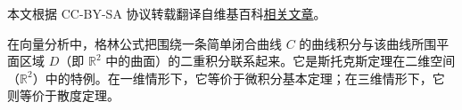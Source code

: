 
本文根据 CC-BY-SA 协议转载翻译自维基百科\href{https://en.wikipedia.org/wiki/Green\%27s_theorem}{相关文章}。

在向量分析中，格林公式把围绕一条简单闭合曲线 $C$ 的曲线积分与该曲线所围平面区域 $D$（即 $\mathbb{R}^2$ 中的曲面）的二重积分联系起来。它是斯托克斯定理在二维空间（$\mathbb{R}^2$）中的特例。在一维情形下，它等价于微积分基本定理；在三维情形下，它则等价于散度定理。
